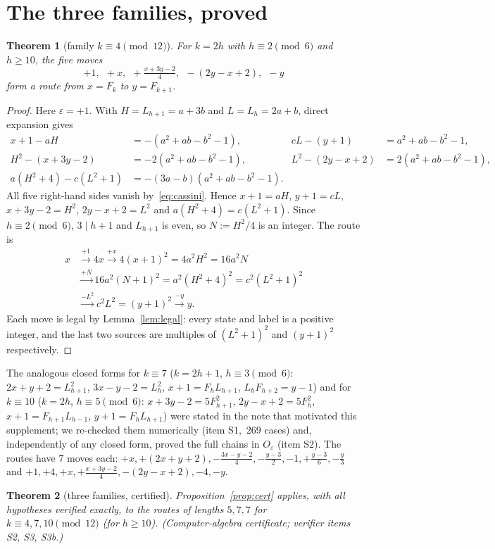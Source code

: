 \documentclass[11pt]{article}
\newtheorem{theorem}{Theorem}
\theoremstyle{definition}
\theoremstyle{remark}
\begin{document}
\section{The three families, proved}
\begin{theorem}[family $k\equiv 4 \pmod{12}$]\label{thm:A}
For $k=2h$ with $h\equiv 2\pmod 6$ and $h\ge 10$, the five moves
\[
+1,\ \ +x,\ \ +\tfrac{x+3y-2}{4},\ \ -(2y-x+2),\ \ -y
\]
form a route from $x=F_k$ to $y=F_{k+1}$.
\end{theorem}
\begin{proof}
Here $\varepsilon=+1$. With $H=L_{h+1}=a+3b$ and $L=L_h=2a+b$, direct expansion gives
\begin{align*}
x+1-aH&=-(a^2+ab-b^2-1), & cL-(y+1)&=a^2+ab-b^2-1,\\
H^2-(x+3y-2)&=-2(a^2+ab-b^2-1), & L^2-(2y-x+2)&=2(a^2+ab-b^2-1),\\
a(H^2+4)-c(L^2+1)&=-(3a-b)(a^2+ab-b^2-1).
\end{align*}
All five right-hand sides vanish by~\eqref{eq:cassini}. Hence $x+1=aH$, $y+1=cL$, $x+3y-2=H^2$, $2y-x+2=L^2$ and $a(H^2+4)=c(L^2+1)$. Since $h\equiv 2\pmod 6$, $3\mid h+1$ and $L_{h+1}$ is even, so $N:=H^2/4$ is an integer. The route is
\begin{align*}
x&\xrightarrow{+1}4x\xrightarrow{+x}4(x+1)^2=4a^2H^2=16a^2N\\
&\xrightarrow{+N}16a^2(N+1)^2=a^2(H^2+4)^2=c^2(L^2+1)^2\\
&\xrightarrow{-L^2}c^2L^2=(y+1)^2\xrightarrow{-y}y .
\end{align*}
Each move is legal by Lemma~\ref{lem:legal}: every state and label is a positive integer, and the last two sources are multiples of $(L^2+1)^2$ and $(y+1)^2$ respectively.
\end{proof}
The analogous closed forms for $k\equiv 7$ ($k=2h+1$, $h\equiv3\pmod 6$: $2x+y+2=L_{h+1}^2$, $3x-y-2=L_h^2$, $x+1=F_hL_{h+1}$, $L_hF_{h+2}=y-1$) and for $k\equiv 10$ ($k=2h$, $h\equiv5\pmod 6$: $x+3y-2=5F_{h+1}^2$, $2y-x+2=5F_h^2$, $x+1=F_{h+1}L_{h-1}$, $y+1=F_hL_{h+1}$) were stated in the note that motivated this supplement; we re-checked them numerically (item S1, \,$269$ cases) and, independently of any closed form, proved the full chains in $O_\varepsilon$ (item S2). The routes have $7$ moves each:
$+x,+(2x{+}y{+}2),-\tfrac{3x-y-2}{4},-\tfrac{y-3}{2},-1,+\tfrac{y-3}{6},-\tfrac y3$ and $+1,+4,+x,+\tfrac{x+3y-2}{4},-(2y{-}x{+}2),-4,-y$.

\begin{theorem}[three families, certified]
Proposition~\ref{prop:cert} applies, with all hypotheses verified exactly, to the routes of lengths $5,7,7$ for $k\equiv 4,7,10\pmod{12}$ (for $h\ge10$). \emph{(Computer-algebra certificate; verifier items S2, S3, S3b.)}
\end{theorem}
\end{document}
